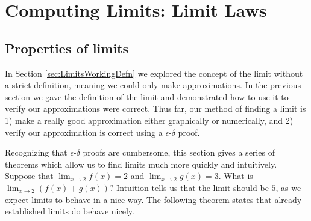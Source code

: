 \section{Computing Limits: Limit Laws}\label{sec:ComputingLimitsAlg}
\subsection*{Properties of limits}


In Section \ref{sec:LimitsWorkingDefn} we explored the concept of the limit without a strict definition, meaning we could only make approximations. In the previous section we gave the definition of the limit and demonstrated how to use it to verify our approximations were correct. Thus far, our method of finding a limit is 1) make a really good approximation either graphically or numerically, and 2) verify our approximation is correct using a $\epsilon$-$\delta$ proof.

Recognizing that $\epsilon$-$\delta$ proofs are cumbersome, this section gives a series of theorems which allow us to find limits much more quickly and intuitively. \\

Suppose that $\lim_{x\to 2} f(x)=2$ and $\lim_{x\to 2} g(x) = 3$. What is $\lim_{x\to 2}(f(x)+g(x))$? Intuition tells us that the limit should be $ 5 $, as we expect limits to behave in a nice way. The following theorem states that already established limits do behave nicely.


